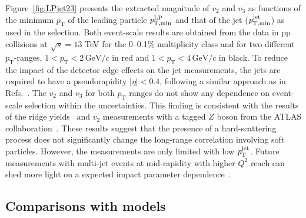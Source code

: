 Figure~\ref{fig:LPjet23} presents the extracted magnitude of $v_2$ and $v_3$ as functions of the minimum $p_\mathrm{T}$ of the leading particle $\it{p}^{\rm{LP}}_{\rm{T,min}}$ and that of the jet ($\it{p}^{\rm{jet}}_{\rm{T,min}}$) as used in the selection. 
Both event-scale results are obtained from the data in pp collisions at $\sqrt{s}= 13$ TeV for the 0--0.1\% multiplicity class and for two different $p_\mathrm{T}$-ranges, $1<p_{\mathrm{T}}<2\,\mathrm{GeV}/c$ in red and $1<p_{\mathrm{T}}<4\,\mathrm{GeV}/c$ in black. %
To reduce the impact of the detector edge effects on the jet measurements, the jets are required to have a pseudorapidity $|\eta|<0.4$, following a similar approach as in Refs.~\cite{PhysRevD.65.092002, Aad:2011fc, Khachatryan:2014waa}. The $v_2$ and $v_3$ for both $p_\mathrm{T}$ ranges do not show any dependence on event-scale selection within the uncertainties. This finding is consistent with the results of the ridge yields~\cite{ALICE:2021nir} and $v_{2}$ measurements with a tagged $Z$ boson from the ATLAS collaboration~\cite{Aaboud:2019mcw}. These results suggest that the presence of a hard-scattering process does not significantly change the long-range correlation involving soft particles.
However, the measurements are only limited with low $\it{p}^{\rm{jet}}_{\rm{T}}$. Future measurements with multi-jet events at mid-rapidity with higher $Q^2$ reach can shed more light on a expected impact parameter dependence~\cite{Sjostrand:1986ep,Frankfurt:2003td,Frankfurt:2010ea}.


\subsection{Comparisons with models}
\label{sec:theory}

